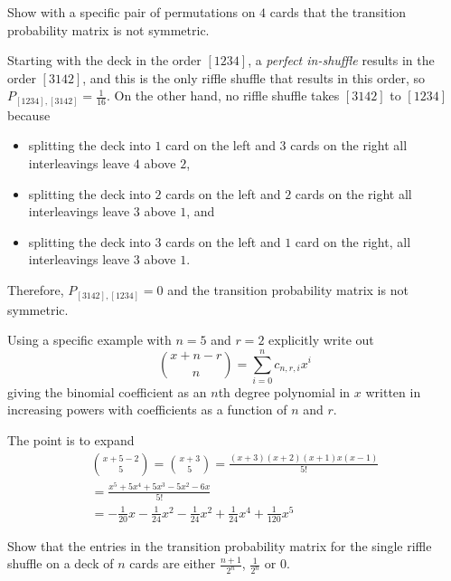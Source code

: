 \documentclass[12pt]{article}
\begin{document}
\begin{exercise}
    Show with a specific pair of permutations on \( 4 \) cards that the
    transition probability matrix is not symmetric.
\end{exercise}
\begin{solution}
    Starting with the deck in the order \( [1234] \), a \emph{perfect
    in-shuffle} results in the order \( [3142] \), and this is the only
    riffle shuffle that results in this order, so \( P_{[1234],[3142]} =
    \frac{1}{16} \).  On the other hand, no riffle shuffle takes \( [3142]
    \) to \( [1234] \) because
    \begin{itemize}
        \item
            splitting the deck into \( 1 \) card on the left and \( 3 \)
            cards on the right all interleavings leave \( 4 \) above \(
            2 \),
        \item
            splitting the deck into \( 2 \) cards on the left and \( 2 \)
            cards on the right all interleavings leave \( 3 \) above \(
            1 \), and
        \item
            splitting the deck into \( 3 \) cards on the left and \( 1 \)
            card on the right, all interleavings leave \( 3 \) above \(
            1 \).
    \end{itemize}
    Therefore, \( P_{[3142],[1234]} = 0 \) and the transition
    probability matrix is not symmetric.
\end{solution}
\begin{exercise}
    Using a specific example with \( n=5 \) and \( r = 2 \) explicitly
    write out
    \[
        \binom{x + n - r}{n} = \sum\limits_{i=0}^n c_{n,r,i} x^i
    \] giving the binomial coefficient as an \( n \)th degree polynomial
    in \( x \) written in increasing powers with coefficients as a
    function of \( n \) and \( r \).
\end{exercise}
\begin{solution}
    The point is to expand
    \begin{multline*}
        \binom{x+5 - 2}{5} = \binom{x+3}{5} = \frac{(x+3)(x+2)(x+1)x(x-1)}
        {5!} \\
        = \frac{x^5 + 5 x^4 + 5 x^3 - 5 x^2 - 6 x}{5!} \\
        = - \frac{1}{20} x - \frac{1}{24} x^2 - \frac{1}{24} x^2 + \frac
        {1}{24} x^4 + \frac{1}{120} x^5
    \end{multline*}
\end{solution}
\begin{exercise}
    Show that the entries in the transition probability matrix for the
    single riffle shuffle on a deck of \( n \) cards are either \( \frac
    {n+1}{2^n} \), \( \frac{1}{2^n} \) or \( 0 \).
\end{exercise}
\end{document}
